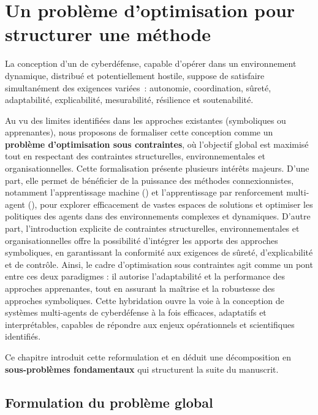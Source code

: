 \clearpage
\thispagestyle{empty}
\null
\newpage

\chapter{Un problème d'optimisation pour structurer une méthode}
\label{chap:hypotheses}

La conception d'un  de cyberdéfense, capable d'opérer dans un environnement dynamique, distribué et potentiellement hostile, suppose de satisfaire simultanément des exigences variées~: autonomie, coordination, sûreté, adaptabilité, explicabilité, mesurabilité, résilience et soutenabilité.

Au vu des limites identifiées dans les approches existantes (symboliques ou apprenantes), nous proposons de formaliser cette conception comme un \textbf{problème d'optimisation sous contraintes}, où l'objectif global est maximisé tout en respectant des contraintes structurelles, environnementales et organisationnelles.
Cette formalisation présente plusieurs intérêts majeurs. D'une part, elle permet de bénéficier de la puissance des méthodes connexionnistes, notamment l'apprentissage machine () et l'apprentissage par renforcement multi-agent (), pour explorer efficacement de vastes espaces de solutions et optimiser les politiques des agents dans des environnements complexes et dynamiques. D'autre part, l'introduction explicite de contraintes structurelles, environnementales et organisationnelles offre la possibilité d'intégrer les apports des approches symboliques, en garantissant la conformité aux exigences de sûreté, d'explicabilité et de contrôle. Ainsi, le cadre d'optimisation sous contraintes agit comme un pont entre ces deux paradigmes : il autorise l'adaptabilité et la performance des approches apprenantes, tout en assurant la maîtrise et la robustesse des approches symboliques. Cette hybridation ouvre la voie à la conception de systèmes multi-agents de cyberdéfense à la fois efficaces, adaptatifs et interprétables, capables de répondre aux enjeux opérationnels et scientifiques identifiés.

Ce chapitre introduit cette reformulation et en déduit une décomposition en \textbf{sous-problèmes fondamentaux} qui structurent la suite du manuscrit.

\section{Formulation du problème global}

